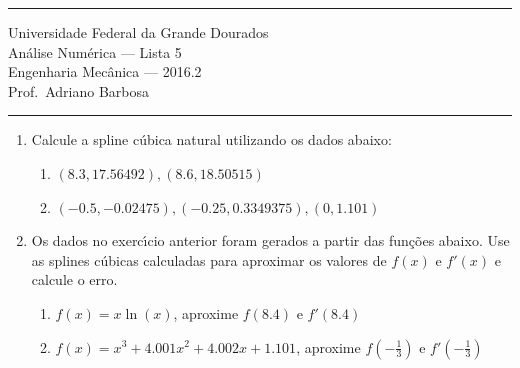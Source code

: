 \documentclass{article}
\begin{document}
\noindent{}\rule{\textwidth}{0.4pt}
\begin{center}
	Universidade Federal da Grande Dourados\\
	An\'alise Num\'erica --- Lista 5 \\
	Engenharia Mec\^anica --- 2016.2 \\
	Prof.\ Adriano Barbosa
\end{center}
\noindent{}\rule{\textwidth}{0.4pt}

\begin{enumerate}
	\item Calcule a spline c\'ubica natural utilizando os dados abaixo:
		\begin{enumerate}
			\item $(8.3, 17.56492), (8.6, 18.50515)$
			\item $(-0.5, -0.02475), (-0.25, 0.3349375), (0, 1.101)$
		\end{enumerate}

	\item Os dados no exerc\'{\i}cio anterior foram gerados a partir das fun\c{c}\~oes
		abaixo. Use as splines c\'ubicas calculadas para aproximar os valores de
		$f(x)$ e $f'(x)$ e calcule o erro.
		\begin{enumerate}
			\item $f(x) = x \ln(x)$, aproxime $f(8.4)$ e $f'(8.4)$
			\item $f(x) = x^3 + 4.001x^2 + 4.002x + 1.101$, aproxime
				$f\left(-\frac{1}{3}\right)$ e $f'\left(-\frac{1}{3}\right)$
		\end{enumerate}




\end{enumerate}
\end{document}
